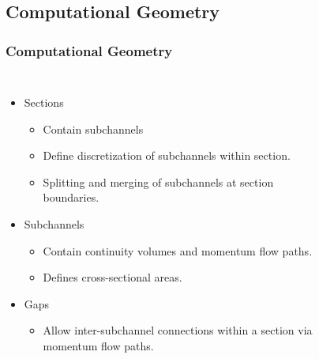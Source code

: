 \documentclass[compress,xcolor=table]{beamer}
\begin{document}
\subsection[Computational Geometry]{Computational Geometry}
\begin{frame}
\frametitle{Computational Geometry}
\begin{columns}

\begin{itemize}
\item{Sections
\begin{itemize}
\item{Contain subchannels}
\item{Define discretization of subchannels within section.}
\item{Splitting and merging of subchannels at section boundaries.}
\end{itemize}
}
\item{Subchannels
\begin{itemize}
\item{Contain continuity volumes and momentum flow paths.}
\item{Defines cross-sectional areas.}
\end{itemize}
}
\item{Gaps
\begin{itemize}
\item{Allow inter-subchannel connections within a section via momentum flow paths.}
\end{itemize}
}
\end{itemize}

\begin{figure}[t]
\centering
\resizebox{!}{0.7\textheight}{

}
\end{figure}

\end{columns}

\end{frame}
\end{document}
